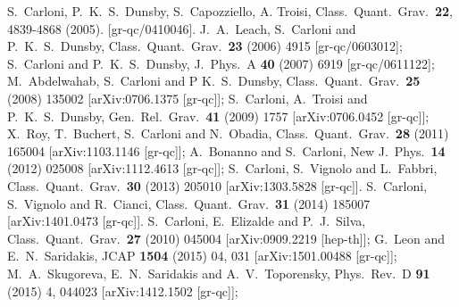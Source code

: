 \documentclass[a4paper,aps,onecolumn,nofootinbib]{revtex4}
\begin{document}
\begin{thebibliography}{999}
  S.~Carloni, P.~K.~S.~Dunsby, S.~Capozziello, A. Troisi,
  Class.\ Quant.\ Grav.\  {\bf 22}, 4839-4868 (2005).
  [gr-qc/0410046].
  J.~A.~Leach, S.~Carloni and P.~K.~S.~Dunsby,
  Class.\ Quant.\ Grav.\  {\bf 23} (2006) 4915
  [gr-qc/0603012];
  S.~Carloni and P.~K.~S.~Dunsby,
  J.\ Phys.\ A {\bf 40} (2007) 6919
  [gr-qc/0611122];
  M.~Abdelwahab, S.~Carloni and P K.~S.~Dunsby,
  Class.\ Quant.\ Grav.\  {\bf 25} (2008) 135002
  [arXiv:0706.1375 [gr-qc]];
  S.~Carloni, A.~Troisi and P.~K.~S.~Dunsby,
  Gen.\ Rel.\ Grav.\  {\bf 41} (2009) 1757
  [arXiv:0706.0452 [gr-qc]];
  X.~Roy, T.~Buchert, S.~Carloni and N.~Obadia,
  Class.\ Quant.\ Grav.\  {\bf 28} (2011) 165004
  [arXiv:1103.1146 [gr-qc]];
  A.~Bonanno and S.~Carloni,
  New J.\ Phys.\  {\bf 14} (2012) 025008
  [arXiv:1112.4613 [gr-qc]];
S.~Carloni, S.~Vignolo and L.~Fabbri,
  Class.\ Quant.\ Grav.\  {\bf 30} (2013) 205010
  [arXiv:1303.5828 [gr-qc]].
%
 S.~Carloni, S.~Vignolo and R.~Cianci,
  Class.\ Quant.\ Grav.\  {\bf 31} (2014) 185007
  [arXiv:1401.0473 [gr-qc]].
  S.~Carloni, E.~Elizalde and P.~J.~Silva,
  Class.\ Quant.\ Grav.\  {\bf 27} (2010) 045004
  [arXiv:0909.2219 [hep-th]];
   G.~Leon and E.~N.~Saridakis,
  JCAP {\bf 1504} (2015) 04,  031
  [arXiv:1501.00488 [gr-qc]];
   M.~A.~Skugoreva, E.~N.~Saridakis and A.~V.~Toporensky,
  Phys.\ Rev.\ D {\bf 91} (2015) 4,  044023
  [arXiv:1412.1502 [gr-qc]];

\end{thebibliography}
\end{document}
